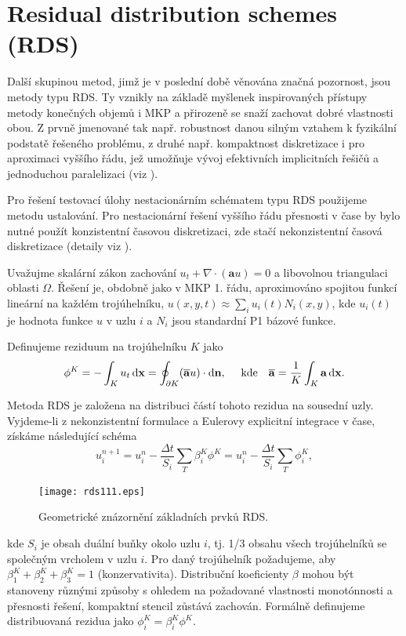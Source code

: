 \documentclass{sna}
\begin{document}
\section{Residual distribution schemes (RDS)}
Další skupinou metod, jimž je v poslední době věnována značná pozornost, jsou metody typu RDS. Ty vznikly na základě myšlenek inspirovaných přístupy metody konečných objemů i MKP a přirozeně se snaží zachovat dobré vlastnosti obou. Z prvně jmenované tak např. robustnost danou silným vztahem k fyzikální podstatě řešeného problému, z druhé např. kompaktnost diskretizace i pro aproximaci vyššího řádu, jež umožňuje vývoj efektivních implicitních řešičů a jednoduchou paralelizaci (viz \cite{Deconinck-2003-IRD}).

Pro řešení testovací úlohy nestacionárním schématem typu RDS použijeme metodu ustalování. Pro nestacionární řešení vyššího řádu přesnosti v čase by bylo nutné použít konzistentní časovou diskretizaci, zde stačí nekonzistentní časová diskretizace (detaily viz \cite{Deconinck-2003-IRD}).

Uvažujme skalární zákon zachování $u_t+ \nabla \cdot (\mathbf{a}u) = 0$ a libovolnou triangulaci oblasti $\Omega$. Řešení je, obdobně jako v MKP 1. řádu, aproximováno spojitou funkcí lineární na každém trojúhelníku, $u(x,y,t)\approx\sum_i u_i(t)N_i(x,y)$, kde $u_i(t)$ je hodnota funkce $u$ v uzlu $i$ a $N_i$ jsou standardní P1 bázové funkce.

Definujeme reziduum na trojúhelníku $K$ jako 
\begin{equation*}
\phi^K=-\int_{K} u_t \,\mathrm{d}\mathbf{x}=\oint_{\partial K}(\overline{\mathbf{a}}u)\cdot\mathrm{d}\mathbf{n},\quad \mbox{ kde}\quad \overline{\mathbf{a}} = \frac{1}{K}\int_{K} \mathbf{a} \,\mathrm{d}\mathbf{x}.
\end{equation*}

Metoda RDS je založena na distribuci částí tohoto rezidua na sousední uzly. Vyjdeme-li z nekonzistentní formulace a Eulerovy explicitní integrace v čase, získáme následující schéma
\begin{equation*}
u_i^{n+1}=u_i^n-\frac{\Delta t}{S_i}\sum_T\beta^K_i\phi^K=u_i^n-\frac{\Delta t}{S_i}\sum_T\phi^K_i,
\end{equation*}
\begin{figure}
\begin{center}
\texttt{[image: rds111.eps]}
\caption{Geometrické znázornění základních prvků RDS.}
\end{center}
\end{figure}
kde $S_i$ je obsah  duální buňky okolo uzlu $i$, tj. 1/3 obsahu všech trojúhelníků se společným vrcholem v uzlu $i$. Pro daný trojúhelník požadujeme, aby \mbox{$\beta_1^K+\beta_2^K+\beta_3^K=1$} (konzervativita). Distribuční koeficienty $\beta$ mohou být stanoveny různými způsoby s ohledem na požadované vlastnosti monotónnosti a přesnosti řešení, kompaktní stencil zůstává zachován. Formálně definujeme distribuovaná rezidua jako \mbox{$\phi^K_i=\beta^K_i\phi^K$}.
\end{document}
